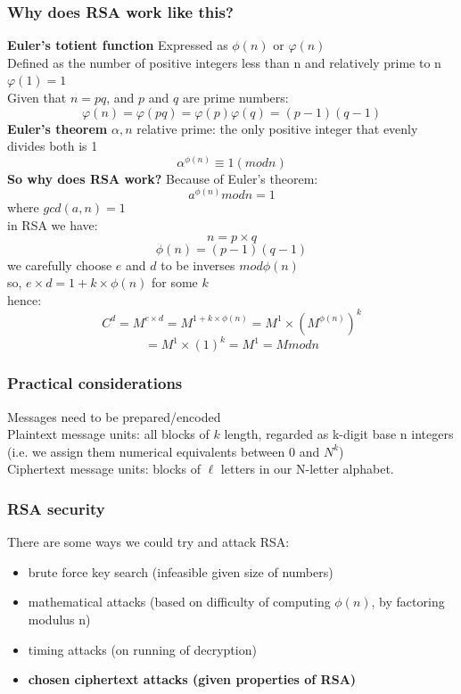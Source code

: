 \documentclass{article}
\begin{document}
\subsubsection{Why does RSA work like this?}
\textbf{Euler's totient function}
Expressed as $\phi(n)$ or $\varphi(n)$
\\Defined as the number of positive integers less than n and relatively prime to n
\\$\varphi(1) = 1$
\\Given that $n=pq$, and $p$ and $q$ are prime numbers:
$$\varphi(n)=\varphi(pq)=\varphi(p)\varphi(q)=(p-1)(q-1)$$
\textbf{Euler's theorem}
$\alpha, n$ relative prime: the only positive integer that evenly divides both is 1
$$\alpha^{\phi(n)}\equiv 1(mod n)$$
\textbf{So why does RSA work?}
Because of Euler's theorem:
$$a^{\phi(n)}mod n = 1$$ where $gcd(a,n)=1$
\\in RSA we have:
$$n=p\times q$$
$$\phi(n)=(p-1)(q-1)$$
we carefully choose $e$ and $d$ to be inverses $mod\phi(n)$
\\so, $e\times d = 1+k \times \phi(n)$ for some $k$
\\hence:
$$C^d = M^{e\times d} = M^{1+k\times \phi(n)} = M^1 \times (M^{\phi(n)})^k$$
$$= M^1 \times (1)^k = M^1 = M mod n$$
\subsubsection{Practical considerations}
Messages need to be prepared/encoded
\\Plaintext message units: all blocks of $k$ length, regarded as k-digit base n integers (i.e. we assign them numerical equivalents between $0$ and $N^k$)
\\Ciphertext message units: blocks of $\ell$ letters in our N-letter alphabet.
\subsubsection{RSA security}
There are some ways we could try and attack RSA:
\begin{itemize}
    \item brute force key search (infeasible given size of numbers)
    \item mathematical attacks (based on difficulty of computing $\phi(n)$, by factoring modulus n)
    \item timing attacks (on running of decryption)
    \item \textbf{chosen ciphertext attacks (given properties of RSA)}
\end{itemize}
\end{document}
